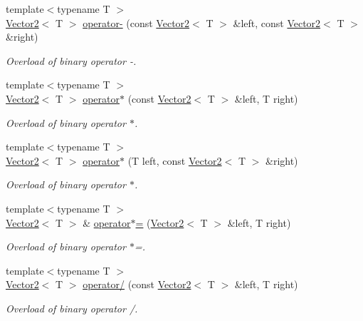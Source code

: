 \begin{DoxyCompactItemize}
{\footnotesize template$<$typename T $>$ }\\\hyperlink{classsf_1_1_vector2}{Vector2}$<$ T $>$ \hyperlink{classsf_1_1_vector2_ad027adae53ec547a86c20deeb05c9e85}{operator-\/} (const \hyperlink{classsf_1_1_vector2}{Vector2}$<$ T $>$ \&left, const \hyperlink{classsf_1_1_vector2}{Vector2}$<$ T $>$ \&right)
\begin{DoxyCompactList}\small\item\em Overload of binary operator -\/. \end{DoxyCompactList}\item 
{\footnotesize template$<$typename T $>$ }\\\hyperlink{classsf_1_1_vector2}{Vector2}$<$ T $>$ \hyperlink{classsf_1_1_vector2_a5f48ca928995b41c89f155afe8d16b02}{operator$\ast$} (const \hyperlink{classsf_1_1_vector2}{Vector2}$<$ T $>$ \&left, T right)
\begin{DoxyCompactList}\small\item\em Overload of binary operator $\ast$. \end{DoxyCompactList}\item 
{\footnotesize template$<$typename T $>$ }\\\hyperlink{classsf_1_1_vector2}{Vector2}$<$ T $>$ \hyperlink{classsf_1_1_vector2_ad8b3e1cf7b156a984bc1427539ca8605}{operator$\ast$} (T left, const \hyperlink{classsf_1_1_vector2}{Vector2}$<$ T $>$ \&right)
\begin{DoxyCompactList}\small\item\em Overload of binary operator $\ast$. \end{DoxyCompactList}\item 
{\footnotesize template$<$typename T $>$ }\\\hyperlink{classsf_1_1_vector2}{Vector2}$<$ T $>$ \& \hyperlink{classsf_1_1_vector2_abea24cb28c0d6e2957e259ba4e65d70e}{operator$\ast$=} (\hyperlink{classsf_1_1_vector2}{Vector2}$<$ T $>$ \&left, T right)
\begin{DoxyCompactList}\small\item\em Overload of binary operator $\ast$=. \end{DoxyCompactList}\item 
{\footnotesize template$<$typename T $>$ }\\\hyperlink{classsf_1_1_vector2}{Vector2}$<$ T $>$ \hyperlink{classsf_1_1_vector2_a7409dd89cb3aad6c3bc6622311107311}{operator/} (const \hyperlink{classsf_1_1_vector2}{Vector2}$<$ T $>$ \&left, T right)
\begin{DoxyCompactList}\small\item\em Overload of binary operator /. \end{DoxyCompactList}\item 

\end{DoxyCompactItemize}

